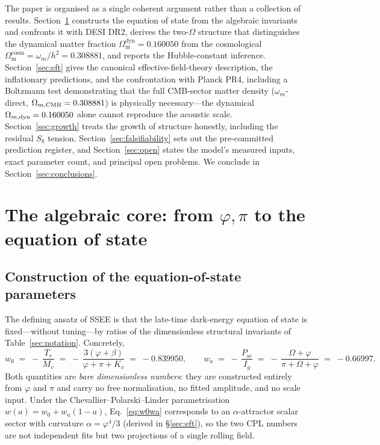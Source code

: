 \documentclass[a4paper,11pt]{article}
\newcommand{\Om}{\Omega_{\mathrm{m}}}
\begin{document}
The paper is organised as a single coherent argument rather than a collection of
results. Section~\ref{sec:core} constructs the equation of state from the
algebraic invariants and confronts it with DESI DR2, derives the two-$\Omega$
structure that distinguishes the dynamical matter fraction
$\Om^{\mathrm{dyn}}=0.160050$ from the cosmological $\Om^{\mathrm{cosm}}=\omega_m/h^2=0.308881$, and
reports the Hubble-constant inference. Section~\ref{sec:eft} gives the canonical
effective-field-theory description, the inflationary predictions, and the
confrontation with Planck PR4, including a Boltzmann test demonstrating that the
full CMB-sector matter density ($\omega_m$-direct, $\Omega_{m,\rm CMB}=0.308881$) is
physically necessary---the dynamical $\Omega_{m,\rm dyn}=0.160050$ alone cannot
reproduce the acoustic scale. Section~\ref{sec:growth} treats
the growth of structure honestly, including the residual $S_8$ tension.
Section~\ref{sec:falsifiability} sets out the pre-committed prediction register,
and Section~\ref{sec:open} states the model's measured inputs, exact parameter
count, and principal open problems. We conclude in
Section~\ref{sec:conclusions}.

\section{The algebraic core: from $\varphi,\pi$ to the equation of state}
\label{sec:core}

\subsection{Construction of the equation-of-state parameters}
\label{sec:w0wa-construction}
The defining ansatz of SSEE is that the late-time dark-energy equation of
state is fixed---without tuning---by ratios of the dimensionless structural
invariants of Table~\ref{sec:notation}. Concretely,
\begin{equation}
  w_0 \;=\; -\,\frac{T_r}{M_v}
        \;=\; -\,\frac{3(\varphi+\beta)}{\varphi+\pi+K_v}
        \;=\; -0.839950,
  \qquad
  w_a \;=\; -\,\frac{P_{\mathrm{sc}}}{I_g}
        \;=\; -\,\frac{\Omega+\varphi}{\pi+\Omega+\varphi}
        \;=\; -0.66997 .
  \label{eq:w0wa}
\end{equation}
Both quantities are \emph{bare dimensionless numbers}: they are constructed
entirely from $\varphi$ and $\pi$ and carry no free normalisation, no fitted
amplitude, and no scale input. Under the Chevallier--Polarski--Linder
parametrisation $w(a)=w_0+w_a(1-a)$, Eq.~\eqref{eq:w0wa} corresponds to an
$\alpha$-attractor scalar sector with curvature $\alpha=\varphi^4/3$ (derived
in \S\ref{sec:eft}), so the two CPL numbers are not independent fits but two
projections of a single rolling field.
\end{document}
